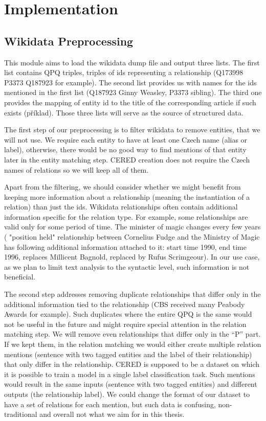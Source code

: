\section{Implementation}



\subsection{Wikidata Preprocessing}
\label{sec:wikidata_preprocessing_implementation}
This module aims to load the wikidata dump file and output three lists. The first list contains QPQ triples, triples of ids representing a relationship (Q173998 P3373 Q187923 for example). The second list provides us with names for the ids mentioned in the first list (Q187923 Ginny Weasley, P3373 sibling). The third one provides the mapping of entity id to the title of the corresponding article if such exists (příklad). Those three lists will serve as the source of structured data.

The first step of our preprocessing is to filter wikidata to remove entities, that we will not use. We require each entity to have at least one Czech name (alias or label), otherwise, there would be no good way to find mentions of that entity later in the entity matching step. CERED creation does not require the Czech names of relations so we will keep all of them.

Apart from the filtering, we should consider whether we might benefit from keeping more information about a relationship (meaning the instantiation of a relation) than just the ids. Wikidata relationships often contain additional information specific for the relation type. For example, some relationships are valid only for some period of time. The minister of magic changes every few years ( "position held" relationship between Cornelius Fudge and the Ministry of Magic has following additional information attached to it: start time 1990, end time 1996, replaces Millicent Bagnold, replaced by Rufus Scrimgeour). In our use case, as we plan to limit text analysis to the syntactic level, such information is not beneficial. 

The second step addresses removing duplicate relationships that differ only in the additional information tied to the relationship (CBS received many Peabody Awards for example). Such duplicates where the entire QPQ is the same would not be useful in the future and might require special attention in the relation matching step. We will remove even relationships that differ only in the “P” part. If we kept them, in the relation matching we would either create multiple relation mentions (sentence with two tagged entities and the label of their relationship) that only differ in the relationship. CERED is supposed to be a dataset on which it is possible to train a model in a single label classification task. Such mentions would result in the same inputs (sentence with two tagged entities) and different outputs (the relationship label). We could change the format of our dataset to have a set of relations for each mention, but such data is confusing, non-traditional and overall not what we aim for in this thesis. 

